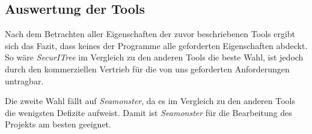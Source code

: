 \pagebreak
\subsection{Auswertung der Tools}
Nach dem Betrachten aller Eigenschaften der zuvor beschriebenen Tools ergibt sich das Fazit, dass keines der Programme alle geforderten 
Eigenschaften abdeckt.
So wäre \textit{SecurITree} im Vergleich zu den anderen Tools die beste Wahl, ist jedoch durch den kommerziellen Vertrieb für die von 
uns geforderten Anforderungen untragbar.

Die zweite Wahl fällt auf \textit{Seamonster}, da es im Vergleich zu den anderen Tools die wenigsten Defizite aufweist.
Damit ist \textit{Seamonster} für die Bearbeitung des Projekts am besten geeignet.



